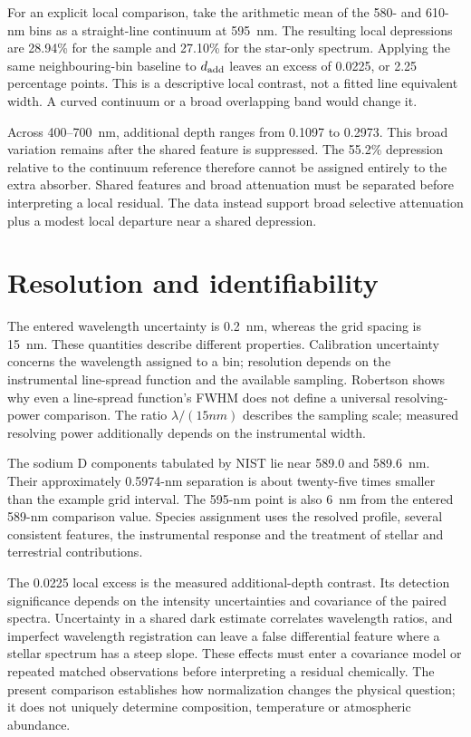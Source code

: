 For an explicit local comparison, take the arithmetic mean of the 580- and 610-nm bins as a straight-line continuum at 595~nm. The resulting local depressions are 28.94\% for the sample and 27.10\% for the star-only spectrum. Applying the same neighbouring-bin baseline to $d_{\rm add}$ leaves an excess of 0.0225, or 2.25 percentage points. This is a descriptive local contrast, not a fitted line equivalent width. A curved continuum or a broad overlapping band would change it.

Across 400--700~nm, additional depth ranges from 0.1097 to 0.2973. This broad variation remains after the shared feature is suppressed. The 55.2\% depression relative to the continuum reference therefore cannot be assigned entirely to the extra absorber. Shared features and broad attenuation must be separated before interpreting a local residual. The data instead support broad selective attenuation plus a modest local departure near a shared depression.

\section{Resolution and identifiability}
The entered wavelength uncertainty is 0.2~nm, whereas the grid spacing is 15~nm. These quantities describe different properties. Calibration uncertainty concerns the wavelength assigned to a bin; resolution depends on the instrumental line-spread function and the available sampling. Robertson shows why even a line-spread function's FWHM does not define a universal resolving-power comparison\cite{robertson2013}. The ratio $\lambda/(15\unit{nm})$ describes the sampling scale; measured resolving power additionally depends on the instrumental width.

The sodium D components tabulated by NIST lie near 589.0 and 589.6~nm\cite{nistasd2024}. Their approximately 0.5974-nm separation is about twenty-five times smaller than the example grid interval. The 595-nm point is also 6~nm from the entered 589-nm comparison value. Species assignment uses the resolved profile, several consistent features, the instrumental response and the treatment of stellar and terrestrial contributions.

The 0.0225 local excess is the measured additional-depth contrast. Its detection significance depends on the intensity uncertainties and covariance of the paired spectra. Uncertainty in a shared dark estimate correlates wavelength ratios, and imperfect wavelength registration can leave a false differential feature where a stellar spectrum has a steep slope. These effects must enter a covariance model or repeated matched observations before interpreting a residual chemically. The present comparison establishes how normalization changes the physical question; it does not uniquely determine composition, temperature or atmospheric abundance.
